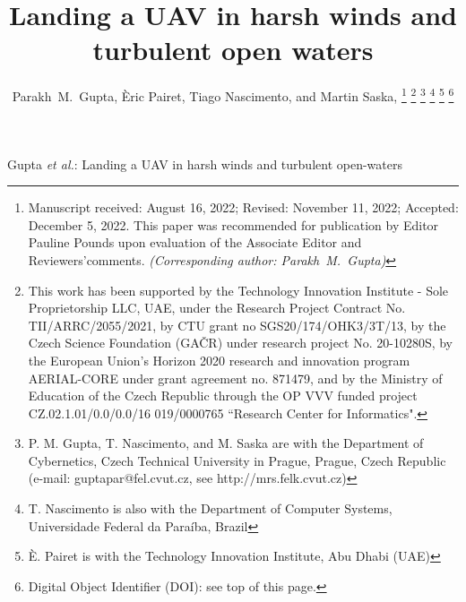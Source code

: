 \documentclass[letterpaper, 10 pt, journal, twoside]{IEEEtran}
\begin{document}


\title{Landing a UAV in harsh winds and turbulent open waters}

\author{Parakh~M.~Gupta, Èric Pairet,  Tiago Nascimento,  and Martin Saska, %
\thanks{Manuscript received: August 16, 2022; Revised: November 11, 2022; Accepted: December 5, 2022. This paper was recommended for publication by Editor Pauline Pounds upon evaluation of the Associate Editor and Reviewers’comments. \textit{(Corresponding author: Parakh~M.~Gupta)}}
\thanks{This work has been supported by the Technology Innovation Institute - Sole Proprietorship LLC, UAE, under the Research Project Contract No. TII/ARRC/2055/2021, by CTU grant no SGS20/174/OHK3/3T/13, by the Czech Science Foundation (GAČR) under research project No. 20-10280S, by the European Union’s Horizon 2020 research and innovation program AERIAL-CORE under grant agreement no. 871479, and by the Ministry of Education of the Czech Republic through the OP VVV funded project CZ.02.1.01/0.0/0.0/16 019/0000765 ``Research Center for Informatics".}%
\thanks{P. M. Gupta, T. Nascimento, and M. Saska are with the Department of Cybernetics, Czech Technical University in Prague, Prague, Czech Republic (e-mail: guptapar@fel.cvut.cz, see http://mrs.felk.cvut.cz)}
\thanks{T. Nascimento is also with the Department of Computer Systems, Universidade Federal da Paraíba, Brazil}
\thanks{È. Pairet is with the Technology Innovation Institute, Abu Dhabi (UAE)}
\thanks{Digital Object Identifier (DOI): see top of this page.}
}

{Gupta \MakeLowercase{\textit{et al.}}: Landing a UAV in harsh winds and turbulent open-waters} 



\graphicspath{{./figures/}}

\maketitle
\end{document}
